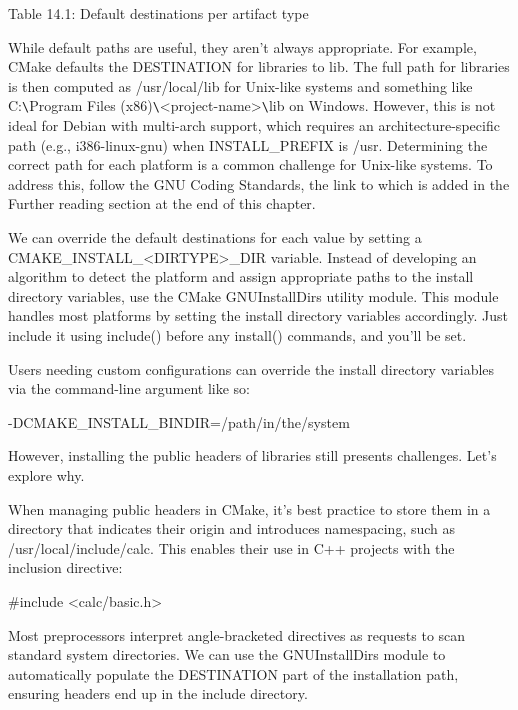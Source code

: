 \begin{center}
Table 14.1: Default destinations per artifact type
\end{center}

While default paths are useful, they aren’t always appropriate. For example, CMake defaults the DESTINATION for libraries to lib. The full path for libraries is then computed as /usr/local/lib for Unix-like systems and something like C:\verb|\|Program Files (x86)\verb|\|<project-name>\verb|\|lib on Windows. However, this is not ideal for Debian with multi-arch support, which requires an architecture-specific path (e.g., i386-linux-gnu) when INSTALL\_PREFIX is /usr. Determining the correct path for each platform is a common challenge for Unix-like systems. To address this, follow the GNU Coding Standards, the link to which is added in the Further reading section at the end of this chapter.

We can override the default destinations for each value by setting a CMAKE\_INSTALL\_<DIRTYPE>\_DIR variable. Instead of developing an algorithm to detect the platform and assign appropriate paths to the install directory variables, use the CMake GNUInstallDirs utility module. This module handles most platforms by setting the install directory variables accordingly. Just include it using include() before any install() commands, and you’ll be set.

Users needing custom configurations can override the install directory variables via the command-line argument like so:

\begin{shell}
-DCMAKE_INSTALL_BINDIR=/path/in/the/system
\end{shell}

However, installing the public headers of libraries still presents challenges. Let’s explore why.


When managing public headers in CMake, it’s best practice to store them in a directory that indicates their origin and introduces namespacing, such as /usr/local/include/calc. This enables their use in C++ projects with the inclusion directive:

\begin{cpp}
#include <calc/basic.h>
\end{cpp}

Most preprocessors interpret angle-bracketed directives as requests to scan standard system directories. We can use the GNUInstallDirs module to automatically populate the DESTINATION part of the installation path, ensuring headers end up in the include directory.

